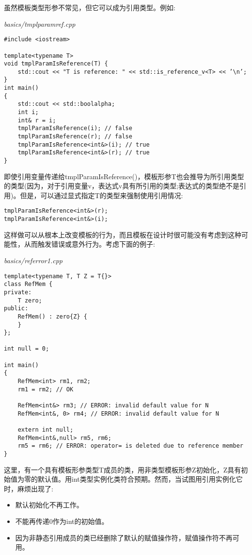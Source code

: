虽然模板类型形参不常见，但它可以成为引用类型。例如:

\noindent
\textit{basics/tmplparamref.cpp}
\begin{lstlisting}[style=styleCXX]
#include <iostream>

template<typename T>
void tmplParamIsReference(T) {
	std::cout << "T is reference: " << std::is_reference_v<T> << ’\n’;
}
int main()
{
	std::cout << std::boolalpha;
	int i;
	int& r = i;
	tmplParamIsReference(i); // false
	tmplParamIsReference(r); // false
	tmplParamIsReference<int&>(i); // true
	tmplParamIsReference<int&>(r); // true
}
\end{lstlisting}

即使引用变量传递给tmplParamIsReference()，模板形参T也会推导为所引用类型的类型(因为，对于引用变量v，表达式v具有所引用的类型;表达式的类型绝不是引用)。但是，可以通过显式指定T的类型来强制使用引用情况:

\begin{lstlisting}[style=styleCXX]
tmplParamIsReference<int&>(r);
tmplParamIsReference<int&>(i);
\end{lstlisting}

这样做可以从根本上改变模板的行为，而且模板在设计时很可能没有考虑到这种可能性，从而触发错误或意外行为。考虑下面的例子:

\noindent
\textit{basics/referror1.cpp}
\begin{lstlisting}[style=styleCXX]
template<typename T, T Z = T{}>
class RefMem {
private:
	T zero;
public:
	RefMem() : zero{Z} {
	}
};

int null = 0;

int main()
{
	RefMem<int> rm1, rm2;
	rm1 = rm2; // OK
	
	RefMem<int&> rm3; // ERROR: invalid default value for N
	RefMem<int&, 0> rm4; // ERROR: invalid default value for N
	
	extern int null;
	RefMem<int&,null> rm5, rm6;
	rm5 = rm6; // ERROR: operator= is deleted due to reference member
}
\end{lstlisting}

这里，有一个具有模板形参类型T成员的类，用非类型模板形参Z初始化，Z具有初始值为零的默认值。用int类型实例化类符合预期。然而，当试图用引用实例化它时，麻烦出现了:

\begin{itemize}
\item 
默认初始化不再工作。

\item 
不能再传递0作为int的初始值。

\item 
因为非静态引用成员的类已经删除了默认的赋值操作符，赋值操作符不再可用。
\end{itemize}

